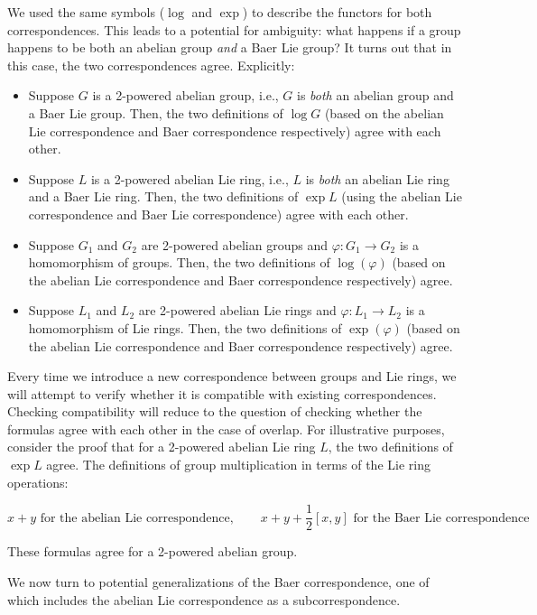 \documentclass{ucetd}
\begin{document}
We used the same symbols ($\log$ and $\exp$) to describe the functors
for both correspondences. This leads to a potential for ambiguity:
what happens if a group happens to be both an abelian group {\em and}
a Baer Lie group? It turns out that in this case, the two
correspondences agree. Explicitly:

\begin{itemize}
\item Suppose $G$ is a 2-powered abelian group, i.e., $G$ is {\em
  both} an abelian group and a Baer Lie group. Then, the two
  definitions of $\log G$ (based on the abelian Lie correspondence and
  Baer correspondence respectively) agree with each other.
\item Suppose $L$ is a 2-powered abelian Lie ring, i.e., $L$ is {\em
  both} an abelian Lie ring and a Baer Lie ring. Then, the two
  definitions of $\exp L$ (using the abelian Lie correspondence and
  Baer Lie correspondence) agree with each other.
\item Suppose $G_1$ and $G_2$ are 2-powered abelian groups and
  $\varphi:G_1 \to G_2$ is a homomorphism of groups. Then, the two
  definitions of $\log(\varphi)$ (based on the abelian Lie
  correspondence and Baer correspondence respectively) agree.
\item Suppose $L_1$ and $L_2$ are 2-powered abelian Lie rings and
  $\varphi:L_1 \to L_2$ is a homomorphism of Lie rings. Then, the two
  definitions of $\exp(\varphi)$ (based on the abelian Lie
  correspondence and Baer correspondence respectively) agree.
\end{itemize}

Every time we introduce a new correspondence between groups and Lie
rings, we will attempt to verify whether it is compatible with
existing correspondences. Checking compatibility will reduce to the
question of checking whether the formulas agree with each other in the
case of overlap. For illustrative purposes, consider the proof that
for a 2-powered abelian Lie ring $L$, the two definitions of $\exp L$
agree. The definitions of group multiplication in terms of the Lie
ring operations:

$$x + y \text{ for the abelian Lie correspondence}, \qquad x + y + \frac{1}{2}[x,y] \text{ for the Baer Lie correspondence}$$

These formulas agree for a 2-powered abelian group.

We now turn to potential generalizations of the Baer correspondence,
one of which includes the abelian Lie correspondence as a
subcorrespondence.
\end{document}
